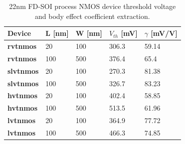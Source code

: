 \FloatBarrier


			\begin{table}[htb!]
				\centering
				\def\arraystretch{1.5}		
				\setlength\arrayrulewidth{1pt}
				\setlength{\tabcolsep}{1em} %
				\fontfamily{\sfdefault}\selectfont 
				\begin{tabular}{|l|l|l|l|l|}	
					\hline 
					\rule[-1ex]{0pt}{2.5ex} \cellcolor{gray!40}\textbf{Device} & \cellcolor{gray!40}\textbf{L [nm]} & \cellcolor{gray!40}\textbf{W [nm]} & \cellcolor{gray!40}\textbf{$V_{th}$ [mV]} & \cellcolor{gray!40}\textbf{$\gamma$ [mV/V]}\\ 
					\hline 
					\rule[-1ex]{0pt}{2.5ex} \textbf{rvtnmos} & 20 & 100 & 306.3 & 59.14 \\ 
					\hline 
					\rule[-1ex]{0pt}{2.5ex} \textbf{rvtnmos} & 100 & 500 & 376.4 & 65.4 \\ 
					\hline 
					\rule[-1ex]{0pt}{2.5ex} \textbf{slvtnmos} & 20 & 100 & 270.3 & 81.38 \\ 
					\hline 
					\rule[-1ex]{0pt}{2.5ex} \textbf{slvtnmos} & 100 & 500 & 326.7 & 83.23 \\ 
					\hline 
					\rule[-1ex]{0pt}{2.5ex} \textbf{hvtnmos} & 20 & 100 & 402.4 & 58.85 \\ 
					\hline 
					\rule[-1ex]{0pt}{2.5ex} \textbf{hvtnmos} & 100 & 500 & 513.5 & 61.96 \\ 
					\hline 
					\rule[-1ex]{0pt}{2.5ex} \textbf{lvtnmos} & 20 & 100 & 364.9 & 77.72 \\ 
					\hline 
					\rule[-1ex]{0pt}{2.5ex} \textbf{lvtnmos} & 100 & 500 & 466.3 & 74.85 \\ 
					\hline 
				\end{tabular} 
				\caption{22nm FD-SOI process NMOS device threshold voltage and body effect coefficient extraction.}
				\label{tab:nfet_vth_gamma}
			\end{table} 

